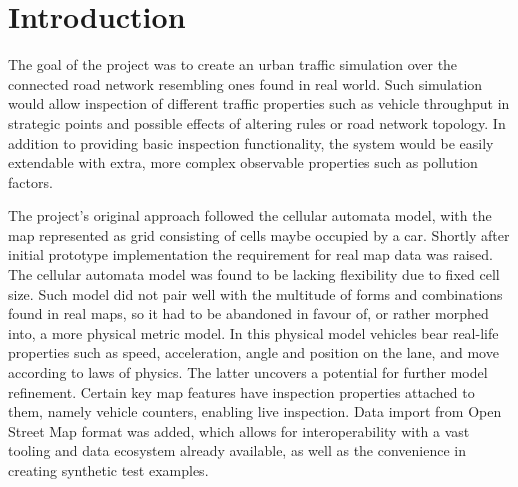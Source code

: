 


\setlength{\parskip}{1em}

\section{Introduction}

The goal of the project was to create an urban traffic simulation over the connected road network resembling ones found in real world. Such simulation would allow inspection of different traffic properties such as vehicle throughput in strategic points and possible effects of altering rules or road network topology. In addition to providing basic inspection functionality, the system would be easily extendable with extra, more complex observable properties such as pollution factors.

The project's original approach followed the cellular automata model, with the map represented as grid consisting of cells maybe occupied by a car. Shortly after initial prototype implementation the requirement for real map data was raised. The cellular automata model was found to be lacking flexibility due to fixed cell size. Such model did not pair well with the multitude of forms and combinations found in real maps, so it had to be abandoned in favour of, or rather morphed into, a more physical metric model. In this physical model vehicles bear real-life properties such as speed, acceleration, angle and position on the lane, and move according to laws of physics. The latter uncovers a potential for further model refinement. Certain key map features have inspection properties attached to them, namely vehicle counters, enabling live inspection. Data import from Open Street Map format was added, which allows for interoperability with a vast tooling and data ecosystem already available, as well as the convenience in creating synthetic test examples.

